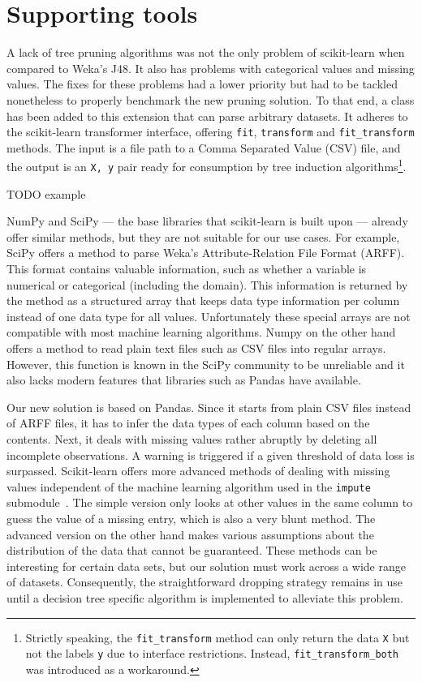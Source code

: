 

\section{Supporting tools}
A lack of tree pruning algorithms was not the only problem of scikit-learn when compared to Weka's J48. It also has problems with categorical values and missing values. The fixes for these problems had a lower priority but had to be tackled nonetheless to properly benchmark the new pruning solution. To that end, a  class has been added to this extension that can parse arbitrary datasets. It adheres to the scikit-learn transformer interface, offering \texttt{fit}, \texttt{transform} and \texttt{fit\_transform} methods. The input is a file path to a Comma Separated Value (CSV) file, and the output is an \texttt{X, y} pair ready for consumption by tree induction algorithms\footnote{Strictly speaking, the \texttt{fit\_transform} method can only return the data \texttt{X} but not the labels \texttt{y} due to interface restrictions. Instead, \texttt{fit\_transform\_both} was introduced as a workaround.}.

TODO example

NumPy and SciPy --- the base libraries that scikit-learn is built upon --- already offer similar methods, but they are not suitable for our use cases. For example, SciPy offers a method to parse Weka's Attribute-Relation File Format (ARFF). This format contains valuable information, such as whether a variable is numerical or categorical (including the domain). This information is returned by the method as a structured array that keeps data type information per column instead of one data type for all values. Unfortunately these special arrays are not compatible with most machine learning algorithms. Numpy on the other hand offers a method to read plain text files such as CSV files into regular arrays. However, this function is known in the SciPy community to be unreliable and it also lacks modern features that libraries such as Pandas have available.

Our new solution is based on Pandas. Since it starts from plain CSV files instead of ARFF files, it has to infer the data types of each column based on the contents. Next, it deals with missing values rather abruptly by deleting all incomplete observations. A warning is triggered if a given threshold of data loss is surpassed. Scikit-learn offers more advanced methods of dealing with missing values independent of the machine learning algorithm used in the \texttt{impute} submodule~\cite{imputation}. The simple version only looks at other values in the same column to guess the value of a missing entry, which is also a very blunt method. The advanced version on the other hand makes various assumptions about the distribution of the data that cannot be guaranteed. These methods can be interesting for certain data sets, but our solution must work across a wide range of datasets. Consequently, the straightforward dropping strategy remains in use until a decision tree specific algorithm is implemented to alleviate this problem.

